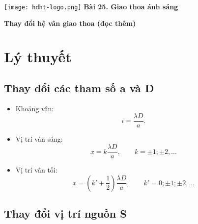 \newcommand{\chapter}[2][]{
	\newcommand{\chapname}{#2}
	\begin{flushleft}
		\begin{minipage}[t]{\linewidth}
			\texttt{[image: hdht-logo.png]}
			\hspace{0pt}	
			\sffamily\bfseries\large Bài  25. Giao thoa ánh sáng
			\begin{flushleft}
				\huge\bfseries #1
			\end{flushleft}
		\end{minipage}
	\end{flushleft}
	\vspace{1cm}
	\normalfont\normalsize
}
\chapter[Thay đổi hệ vân giao thoa (đọc thêm)]{Thay đổi hệ vân giao thoa (đọc thêm)}

\section{Lý thuyết}

\subsection{Thay đổi các tham số a và D}

\begin{itemize}
	\item Khoảng vân:
		\begin{equation}
			i=\dfrac{\lambda D}{a}.
		\end{equation}
	\item Vị trí vân sáng:
	\begin{equation}
		x=k\dfrac{\lambda D}{a},\qquad k=\pm 1; \pm 2,...
	\end{equation}
	\item Vị trí vân tối: 
	\begin{equation}
		x=\left(k'+\dfrac{1}{2}\right) \dfrac{\lambda D}{a},\qquad k'=0; \pm 1; \pm 2,... 
	\end{equation}
\end{itemize}

\subsection{Thay đổi vị trí nguồn S}

